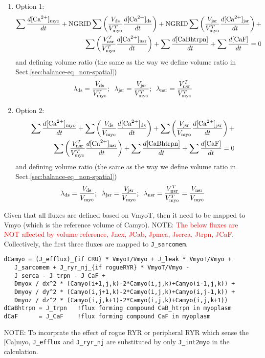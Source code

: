 \begin{enumerate}
  \item Option 1:
\begin{equation}
\begin{split}
 \sum \frac{d[{\text{Ca}^{2+}}]_{\text{myo}}}{dt} + {\text{NGRID}}  
  \sum\left(\frac{V_{\text{ds}}}{V_{\text{myo}}^T}\frac{d[{\text{Ca}^{2+}}]_{\text{ds}}}{dt}\right) + 
  {\text{NGRID}} \sum\left(\frac{V_{\text{jsr}}}{V_{\text{myo}}^T}\frac{d[{\text{Ca}^{2+}}]_{\text{jsr}}}{dt}\right) + \\
  \sum \left(\frac{V_{\text{nsr}}^T}{V_{\text{myo}}^T}\frac{d[{\text{Ca}^{2+}}]_{\text{nsr}}}{dt}
  \right)+
  \sum \frac{d[{\text{CaBhtrpn}}]}{dt} + 
  \sum \frac{d[\text{CaF}]}{dt} = 0
\end{split}
\end{equation}
and defining volume ratio (the same as the way we define volume ratio in
Sect.\ref{sec:balance-eq_non-spatial})
\begin{equation}
\lambda_{\text{ds}} = \frac{V_{\text{ds}}}{V_{\text{myo}}^T};\;\;
\lambda_{\text{jsr}} = \frac{V_{\text{jsr}}}{V_{\text{myo}}^T};\;\;
\lambda_{\text{nsr}} = \frac{V_{\text{nsr}}^T}{V_{\text{myo}}^T}
\end{equation}

\item Option 2:
\begin{equation}
\begin{split}
 \sum \frac{d[{\text{Ca}^{2+}}]_{\text{myo}}}{dt} +   
  \sum\left(\frac{V_{\text{ds}}}{V_{\text{myo}}}\frac{d[{\text{Ca}^{2+}}]_{\text{ds}}}{dt}\right) + 
  \sum\left(\frac{V_{\text{jsr}}}{V_{\text{myo}}}\frac{d[{\text{Ca}^{2+}}]_{\text{jsr}}}{dt}\right) + \\
  \sum \left(\frac{V_{\text{nsr}}^T}{V_{\text{myo}}^T}\frac{d[{\text{Ca}^{2+}}]_{\text{nsr}}}{dt}
  \right)+
  \sum \frac{d[{\text{CaBhtrpn}}]}{dt} + 
  \sum \frac{d[\text{CaF}]}{dt} = 0
\end{split}
\end{equation}
and defining volume ratio (the same as the way we define volume ratio in
Sect.\ref{sec:balance-eq_non-spatial})
\begin{equation}
\lambda_{\text{ds}} = \frac{V_{\text{ds}}}{V_{\text{myo}}};\;\;
\lambda_{\text{jsr}} = \frac{V_{\text{jsr}}}{V_{\text{myo}}};\;\;
\lambda_{\text{nsr}} = \frac{V_{\text{nsr}}^T}{V_{\text{myo}}^T} = \frac{V_{\text{nsr}}}{V_{\text{myo}}}
\end{equation}

\end{enumerate}

Given that all fluxes are defined based on VmyoT, then it need to be mapped to
Vmyo (which is the reference volume of Camyo). NOTE: \textcolor{red}{The below
fluxes are NOT affected by volume reference, Jncx, JCab, Jpmca, Jserca, Jtrpn,
JCaF}. Collectively, the first three fluxes are mapped to \verb!J_sarcomem!.
\begin{verbatim}
dCamyo = (J_efflux)_{if CRU} * VmyoT/Vmyo + J_leak * VmyoT/Vmyo + 
   J_sarcomem + J_ryr_nj_{if rogueRYR} * VmyoT/Vmyo - 
   J_serca - J_trpn - J_CaF + 
   Dmyox / dx^2 * (Camyo(i+1,j,k)-2*Camyo(i,j,k)+Camyo(i-1,j,k)) +
   Dmyoy / dy^2 * (Camyo(i,j+1,k)-2*Camyo(i,j,k)+Camyo(i,j-1,k)) +
   Dmyoz / dz^2 * (Camyo(i,j,k+1)-2*Camyo(i,j,k)+Camyo(i,j,k+1)) 
dCaBhtrpn = J_trpn   !flux forming compound CaB_htrpn in myoplasm
dCaF      = J_CaF    !flux forming compound CaF in myoplasm
\end{verbatim}
NOTE: To incorprate the effect of rogue RYR or peripheral RYR which sense the
[Ca]myo, \verb!J_efflux! and \verb!J_ryr_nj! are substituted by
only \verb!J_int2myo! in the calculation.

